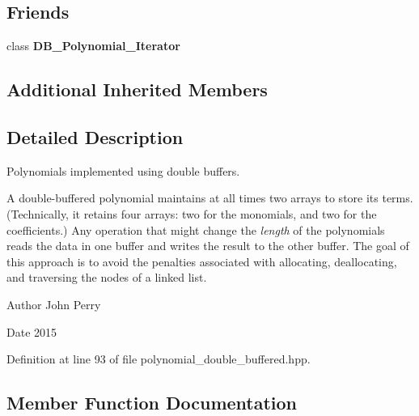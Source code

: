 \subsection*{Friends}
\begin{DoxyCompactItemize}
\item 
\mbox{\label{class_double___buffered___polynomial_aea7290ecfb1e468c20192be43af46a96}} 
class {\bfseries D\+B\+\_\+\+Polynomial\+\_\+\+Iterator}
\end{DoxyCompactItemize}
\subsection*{Additional Inherited Members}


\subsection{Detailed Description}
Polynomials implemented using double buffers.

A double-\/buffered polynomial maintains at all times two arrays to store its terms. (Technically, it retains four arrays\+: two for the monomials, and two for the coefficients.) Any operation that might change the {\itshape length} of the polynomials reads the data in one buffer and writes the result to the other buffer. The goal of this approach is to avoid the penalties associated with allocating, deallocating, and traversing the nodes of a linked list. 

\begin{DoxyAuthor}{Author}
John Perry 
\end{DoxyAuthor}
\begin{DoxyDate}{Date}
2015 
\end{DoxyDate}


Definition at line 93 of file polynomial\+\_\+double\+\_\+buffered.\+hpp.



\subsection{Member Function Documentation}
\mbox{\label{class_double___buffered___polynomial_acd9235d4fe5a56a3a0842a80b4efbdbb}} 
